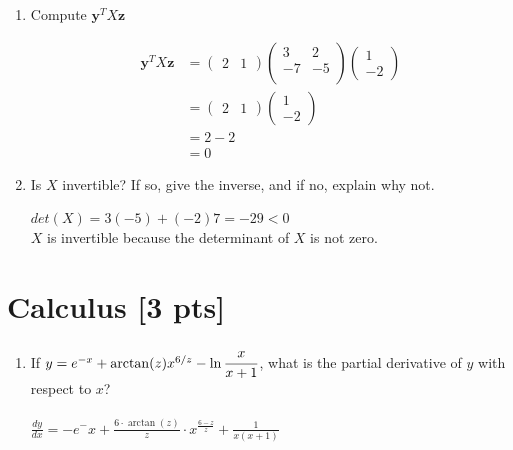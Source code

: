 \documentclass[a4paper]{article}
\theoremstyle{definition}
\newenvironment{soln}{
	\leavevmode\color{blue}\ignorespaces
}{}
\begin{document}
	\begin{enumerate}
		\item 	Compute $\mathbf{y}^{T} X \mathbf{z}$\\
			    \begin{soln} 
						\begin{align*}
			    		\mathbf{y}^{T} X \mathbf{z} &= \begin{pmatrix}
			    			2 & 1
			    		\end{pmatrix} \begin{pmatrix}
			    			3 & 2 \\ -7 & -5 \\
			    		\end{pmatrix} \begin{pmatrix}
			    			1 \\ -2
			    		\end{pmatrix} \\
			    		&= \begin{pmatrix}
			    			2 & 1
			    		\end{pmatrix} \begin{pmatrix}
			    			1 \\ -2
			    		\end{pmatrix} \\
			    		&= 2 - 2 \\
			    		&= 0
			    	\end{align*}
				\end{soln}
		\item 	Is $X$ invertible? If so, give the inverse, and if no, explain why not.\\
		        \begin{soln}  
				$det(X) = 3 (-5) + (-2)7 = -29 <0$ \\
				$X$ is invertible because the determinant of $X$ is not zero.
				\end{soln}
	\end{enumerate}
	
	
	\section{Calculus [3 pts]}
	\begin{enumerate}
		\item If $y = e^{-x} + \arctan(z)x^{6/z} - \ln\cfrac{x}{x+1}$, what is the partial derivative of $y$ with respect to $x$?\\
		\begin{soln}\\  
		$\frac{dy}{dx} = -e^-x + \frac{6\cdot \arctan(z)}{z} \cdot x^{\frac{6-z}{z}}+\frac{1}{x(x+1)}$ 
		\end{soln}
	\end{enumerate}
	
\end{document}
